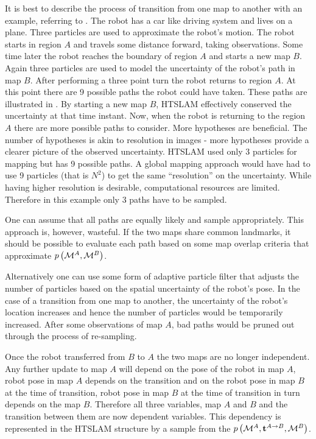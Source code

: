 It is best to describe the process of transition from one map to
another with an example, referring to
. The robot has a car like driving
system and lives on a plane. Three particles are used to approximate
the robot's motion. The robot starts in region $A$ and travels some
distance forward, taking observations. Some time later the robot
reaches the boundary of region $A$ and starts a new map $B$. Again
three particles are used to model the uncertainty of the robot's path
in map $B$. After performing a three point turn the robot returns to
region $A$. At this point there are 9 possible paths the robot could
have taken. These paths are illustrated in
. By starting a new map $B$, HTSLAM
effectively conserved the uncertainty at that time instant. Now, when
the robot is returning to the region $A$ there are more possible paths
to consider. More hypotheses are beneficial. The number of hypotheses
is akin to resolution in images - more hypotheses provide a clearer
picture of the observed uncertainty. HTSLAM used only 3 particles for
mapping but has 9 possible paths. A global mapping approach would have
had to use 9 particles (that is $N^2$) to get the same ``resolution''
on the uncertainty. While having higher resolution is desirable,
computational resources are limited. Therefore in this example only 3
paths have to be sampled.

One can assume that all paths are equally likely and sample
appropriately. This approach is, however, wasteful. If the two maps
share common landmarks, it should be possible to evaluate each path
based on some map overlap criteria that approximate
$\prob{\mapA,\mapB}$.

Alternatively one can use some form of adaptive particle filter
\cite{KLDSampling} that adjusts the number of particles
based on the spatial uncertainty of the robot's pose. In the case of a
transition from one map to another, the uncertainty of the robot's
location increases and hence the number of particles would be
temporarily increased. After some observations of map $A$, bad paths
would be pruned out through the process of re-sampling. 


Once the robot transferred from $B$ to $A$ the two maps are no longer
independent. Any further update to map $A$ will depend on the pose of
the robot in map $A$, robot pose in map $A$ depends on the transition
and on the robot pose in map $B$ at the time of transition, robot pose
in map $B$ at the time of transition in turn depends on the map
$B$. Therefore all three variables, map $A$ and $B$ and the transition
between them are now dependent variables. This dependency is
represented in the HTSLAM structure by a sample from the
$\prob{\mapA,\tr{}{A}{B},\mapB}$.

